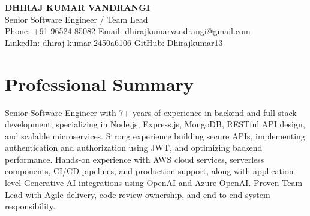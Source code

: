 \documentclass[a4paper,10pt]{article}
\begin{document}
\begin{center}
    {\LARGE \bfseries DHIRAJ KUMAR VANDRANGI} \\
    \vspace{0.3em}
    Senior Software Engineer / Team Lead \\
    \vspace{0.2em}
    {\small Phone: +91 96524 85082 \quad
    Email: \href{mailto:dhirajkumarvandrangi@gmail.com}{dhirajkumarvandrangi@gmail.com}} \\
    {\small LinkedIn: \href{https://www.linkedin.com/in/dhiraj-kumar-2450a6106}{dhiraj-kumar-2450a6106} \quad
    GitHub: \href{https://github.com/Dhirajkumar13}{Dhirajkumar13}}
\end{center}

\vspace{-2mm}
\noindent\makebox[\linewidth]{\rule{\linewidth}{0.4pt}}

\section*{Professional Summary}
Senior Software Engineer with 7+ years of experience in backend and full-stack development, specializing in Node.js, Express.js, MongoDB, RESTful API design, and scalable microservices. Strong experience building secure APIs, implementing authentication and authorization using JWT, and optimizing backend performance. Hands-on experience with AWS cloud services, serverless components, CI/CD pipelines, and production support, along with application-level Generative AI integrations using OpenAI and Azure OpenAI. Proven Team Lead with Agile delivery, code review ownership, and end-to-end system responsibility.

\vspace{-2mm}
\noindent\makebox[\linewidth]{\rule{\linewidth}{0.4pt}}

\end{document}
